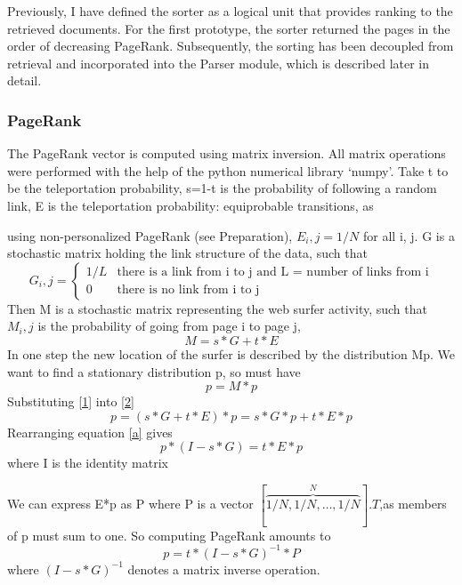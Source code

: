 \documentclass[11pt,twoside,notitlepage]{report}
\begin{document}
Previously, I have defined the sorter as a logical unit that provides ranking
to the retrieved documents. For the first prototype, the sorter returned the
pages in the order of decreasing PageRank.  Subsequently, the sorting has been
decoupled from retrieval and incorporated into the Parser module, which is
described later in detail.

\subsubsection*{PageRank} 
The PageRank vector is computed using matrix inversion. All matrix operations
were performed with the help of the python numerical library `numpy'.  Take t
to be the teleportation probability, s=1-t is the probability of following a
random link, E is the teleportation probability: equiprobable transitions, as

using non-personalized PageRank (see Preparation), \(E_i,j = 1/N\) for all i,
j. G is a stochastic matrix holding the link structure of the data, such that 
\begin{equation*}
  G_i,j = \begin{cases}
    1/L & \text{there is a link from i to j and L = number of links from i}\\
    0   & \text{there is no link from i to j}
  \end{cases}
\end{equation*}
Then M is a stochastic matrix representing the web surfer activity, such
that \(M_i,j\) is the probability of going from page i to page j, 
\begin{equation} \label{1}
  M = s*G +t*E
\end{equation}
In one step the new location of the surfer is described by the distribution Mp.
We want to find a stationary distribution p, so must have
\begin{equation}\label{2}
  p = M*p
\end{equation}
Substituting \ref{1} into \ref{2}
\begin{equation} \label{a}
  p = (s*G+t*E)*p = s*G*p + t*E*p
\end{equation}
Rearranging equation \ref{a} gives
\begin{equation}
  p*(I-s*G) = t*E*p
\end{equation}
where I is the identity matrix

We can express E*p as P where P is a vector
\([\overbrace{1/N,1/N,\dots,1/N}^N].T\),as members of p must sum to one.
So computing PageRank amounts to
\begin{equation}
p  = t*(I-s*G)^{-1}*P
\end{equation}
where \((I-s*G)^{-1}\) denotes a matrix inverse operation.
\end{document}
